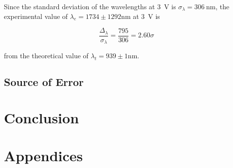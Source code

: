 \documentclass[a4paper]{article}
\begin{document}
Since the standard deviation of the wavelengths at \SI{3}{\volt} is \(
\sigma_{\lambda} = \SI{306}{\nano\meter} \), the experimental value of \(
\lambda_e = 1734 \pm 1292 \si{\nano\meter} \) at \SI{3}{\volt} is

\begin{equation*}
  \frac{\Delta_{\lambda}}{\sigma_{\lambda}} = \frac{795}{306} = 2.60 \sigma
\end{equation*}

from the theoretical value of \( \lambda_t = 939 \pm 1 \si{\nano\meter} \).

\qq 

\subsection{Source of Error}

\section{Conclusion}

\section{Appendices}
\end{document}

